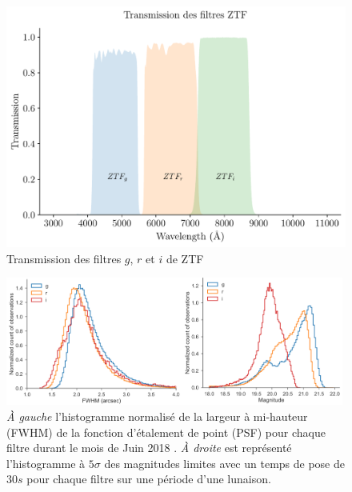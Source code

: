 \documentclass[../main/main.tex]{subfiles}
\begin{document}
\begin{figure}[ht]
  \begin{minipage}[c]{0.55\textwidth}
    \includegraphics[width=\textwidth]{../figures/02_ztf/ZTFfilters.pdf}
  \end{minipage}\hfill
  \begin{minipage}[c]{0.45\textwidth}
    \caption[Transmission des filtres $g$, $r$ et $i$ de
    ZTF]{Transmission des filtres $g$, $r$ et $i$ de ZTF \citep{DekanyZTF2020}}\label{fig:ztffilters}
  \end{minipage}
\end{figure}



\begin{figure}[h]
  \centering
  \includegraphics[width=0.99\textwidth]{../figures/02_ztf/ztfperformances.pdf}
  \caption[Profondeurs et FWHM associées aux filtres de la caméra
  ZTF]{\textit{À gauche} l'histogramme
    normalisé de la largeur à mi-hauteur (FWHM) de la fonction
    d'étalement de point (PSF) pour chaque filtre durant le mois de Juin
    2018 \citep{BellmZTF2019}. \textit{À droite} est représenté
    l'histogramme à $5\sigma$ des magnitudes limites avec un temps de
    pose de $30s$ pour chaque filtre sur une période d'une lunaison.}
  \label{fig:ztfperffilts}
\end{figure}
\end{document}
